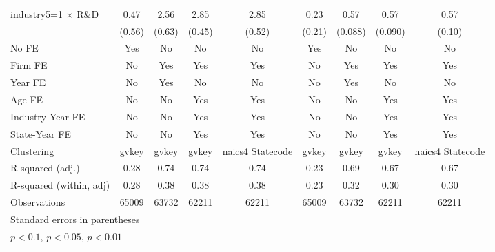 {\begin{tabular}{l*{8}{c}}
\addlinespace
industry5=1 $\times$ R\&D&        0.47         &        2.56\sym{***}&        2.85\sym{***}&        2.85\sym{***}&        0.23         &        0.57\sym{***}&        0.57\sym{***}&        0.57\sym{***}\\
                    &      (0.56)         &      (0.63)         &      (0.45)         &      (0.52)         &      (0.21)         &     (0.088)         &     (0.090)         &      (0.10)         \\
\addlinespace
No FE               &         Yes         &          No         &          No         &          No         &         Yes         &          No         &          No         &          No         \\
\addlinespace
Firm FE             &          No         &         Yes         &         Yes         &         Yes         &          No         &         Yes         &         Yes         &         Yes         \\
\addlinespace
Year FE             &          No         &         Yes         &          No         &          No         &          No         &         Yes         &          No         &          No         \\
\addlinespace
Age FE              &          No         &          No         &         Yes         &         Yes         &          No         &          No         &         Yes         &         Yes         \\
\addlinespace
Industry-Year FE    &          No         &          No         &         Yes         &         Yes         &          No         &          No         &         Yes         &         Yes         \\
\addlinespace
State-Year FE       &          No         &          No         &         Yes         &         Yes         &          No         &          No         &         Yes         &         Yes         \\
\midrule
Clustering          &       gvkey         &       gvkey         &       gvkey         &naics4 Statecode         &       gvkey         &       gvkey         &       gvkey         &naics4 Statecode         \\
R-squared (adj.)    &        0.28         &        0.74         &        0.74         &        0.74         &        0.23         &        0.69         &        0.67         &        0.67         \\
R-squared (within, adj)&        0.28         &        0.38         &        0.38         &        0.38         &        0.23         &        0.32         &        0.30         &        0.30         \\
Observations        &       65009         &       63732         &       62211         &       62211         &       65009         &       63732         &       62211         &       62211         \\
\bottomrule
\multicolumn{9}{l}{\footnotesize Standard errors in parentheses}\\
\multicolumn{9}{l}{\footnotesize \sym{*} \(p<0.1\), \sym{**} \(p<0.05\), \sym{***} \(p<0.01\)}\\
\end{tabular}
}

